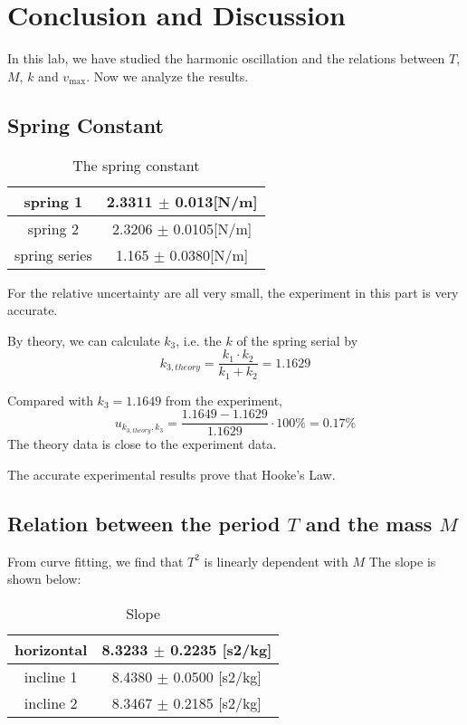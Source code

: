 \section{Conclusion and Discussion}


In this lab, we have studied the harmonic oscillation 
and the relations between $T$, $M$, $k$ and $v_{\max}$. 
Now we analyze the results.


\subsection{Spring Constant}


\begin{table}[H]
\centering
\begin{tabular}{|c|c|}
spring 1 & 2.3311 $\pm$ 0.013[N/m] \\ \hline
spring 2 & 2.3206 $\pm$ 0.0105[N/m] \\ \hline
spring series & 1.165 $\pm$ 0.0380[N/m]  \\ \hline
\end{tabular}
\caption{The spring constant}
\end{table}


For the relative uncertainty are all very small,
the experiment in this part is very accurate.

By theory, we can calculate $k_3$, i.e. the $k$ of the spring serial by 
$$ k_{3,theory} = \frac{k_1 \cdot k_2 }{k_1 + k_2} =  1.1629 $$ 

Compared with $k_3 = 1.1649$  from the experiment,
$$ u_{k_{3,theory},k_3} = \frac{1.1649 - 1.1629}{1.1629} \cdot 100 \%  = 0.17 \% $$ 
The theory data is close to the experiment data.

The accurate experimental results prove that Hooke’s Law.



\subsection{Relation between the period $T$ and the mass $M$}

From curve fitting, we find that $T^2$  is linearly dependent with $M$
The slope is shown below:

\begin{table}[H]
\centering
\begin{tabular}{|c|c|}
horizontal  &  8.3233 $\pm$  0.2235 [s2/kg] \\ \hline
incline 1   &  8.4380 $\pm$  0.0500 [s2/kg] \\ \hline
incline 2   &  8.3467 $\pm$  0.2185 [s2/kg] \\ \hline
\end{tabular}
\caption{Slope}
\end{table}

